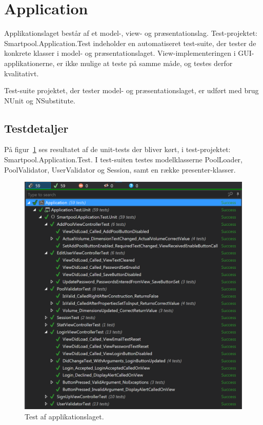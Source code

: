 \section{Application}\label{sec:testapplikation}
Applikationslaget består af et model-, view- og præsentationslag. Test-projektet: Smartpool.Application.Test indeholder en automatiseret test-suite, der tester de konkrete klasser i model- og præsentationslaget. View-implementeringen i GUI-applikationerne, er ikke mulige at teste på samme måde, og testes derfor kvalitativt.

Test-suite projektet, der tester model- og præsentationslaget, er udført med brug NUnit og NSubstitute.

\subsection{Testdetaljer}
På figur~\ref{fig:apptest} ses resultatet af de unit-tests der bliver kørt, i test-projektet: Smartpool.Application.Test. I test-suiten testes modelklasserne PoolLoader, PoolValidator, UserValidator og Session, samt en række presenter-klasser.

\begin{figure}
\centering
\includegraphics[width=0.9\linewidth]{figs/test/apptest}
\caption{Test af applikationslaget.}
\label{fig:apptest}
\end{figure}

